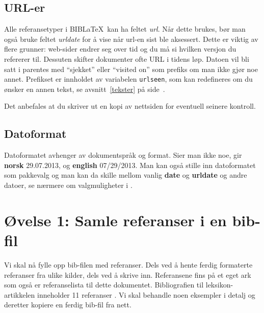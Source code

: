 \documentclass[11pt,norsk,a4paper]{article}
\newcommand{\blt}{B{\smaller[2]IB}\discretionary{-}{}{\kern
    -0.12em}\LaTeX{}}
\begin{document}
\subsection{URL-er}\label{biblatex-url}
Alle referansetyper i \blt\ kan ha feltet \textit{url}. Når dette
brukes, bør man også bruke feltet \textit{urldate} for å vise når
url-en sist ble aksessert. Dette er viktig av flere grunner:
web-sider endrer seg over tid og du må si hvilken versjon du refererer
til. Dessuten skifter dokumenter ofte URL i tidens løp.
Datoen vil bli satt i parentes med ``sjekket'' eller ``visited on''
som prefiks om man ikke gjør noe annet. Prefikset er innholdet av
variabelen \texttt{urlseen}, som kan redefineres om du ønsker en annen
tekst, se avsnitt~\ref{tekster} på side~\pageref{tekster}.

Det anbefales at du skriver ut en kopi av nettsiden for eventuell
seinere kontroll. 





\subsection{Datoformat}
Datoformatet avhenger av dokumentspråk og format. Sier man ikke noe, gir
\textbf{norsk} 29.07.2013, og \textbf{english}  07/29/2013. Man kan
også stille inn datoformatet som pakkevalg og man kan da skille mellom
vanlig \textbf{date} og \textbf{urldate} og andre datoer, se nærmere
om valgmuligheter i \cite[][48--49]{biblatex}.

\section{Øvelse 1: Samle referanser i en bib-fil} Vi skal nå fylle opp
bib-filen med referanser. Dels ved å hente ferdig formaterte
referanser fra ulike kilder, dels ved å skrive inn. Referansene fins
på et eget ark som også er referanselista til dette dokumentet.
Bibliografien til leksikon-artikkelen inneholder 11 referanser
\cite{hutchins1986,olsen1992,johnson1989,shneiderman1983,hartson1989,jacob1986,myers1995,foley1990,foley1987,shneiderman1992,stephenson1999}. Vi
skal behandle noen eksempler i detalj og deretter kopiere en ferdig
bib-fil fra nett.
\end{document}
